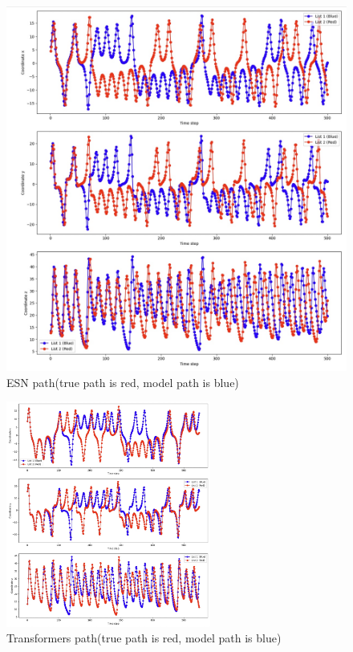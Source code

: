 \documentclass[11pt]{article}
\begin{document}
\begin{figure}
\begin{minipage}[b]{0.49\textwidth}
        \includegraphics[width=\linewidth]{echo_path.jpeg}
        \caption{ESN path(true path is red, model path is blue)}
        \label{fig:echo_path}
    \end{minipage}
\end{figure}
\begin{figure}
    \centering
    \includegraphics[width=0.6\textwidth]{transformers_path.jpeg}
    \caption{Transformers path(true path is red, model path is blue)}
    \label{fig:transformers_path}
\end{figure}
\end{document}
